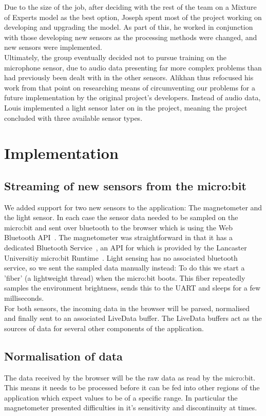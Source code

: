 \documentclass{article}
\begin{document}
Due to the size of the job, after deciding with the rest of the team on a Mixture of Experts model as the best option, Joseph spent most of the project working on developing and upgrading the model. As part of this, he worked in conjunction with those developing new sensors as the processing methods were changed, and new sensors were implemented. \\

Ultimately, the group eventually decided not to pursue training on the microphone sensor, due to audio data presenting far more complex problems than had previously been dealt with in the other sensors. Alikhan thus refocused his work from that point on researching means of circumventing our problems for a future implementation by the original project's developers. Instead of audio data, Louis implemented a light sensor later on in the project, meaning the project concluded with three available sensor types.

\section{Implementation}%
\label{sec:implementation}

\subsection{Streaming of new sensors from the micro:bit}%
\label{subsec:streaming}
We added support for two new sensors to the application: The magnetometer and the light sensor. In each case the sensor data needed to be sampled on the micro:bit and sent over bluetooth to the browser which is using the Web Bluetooth API~\cite{bluetoothapi}. The magnetometer was straightforward in that it has a dedicated Bluetooth Service~\cite{microbitservices}, an API for which is provided by the Lancaster Universitiy micro:bit Runtime~\cite{magnetometerservice}. Light sensing has no associated bluetooth service, so we sent the sampled data manually instead: To do this we start a 'fiber' (a lightweight thread) when the micro:bit boots. This fiber repeatedly samples the environment brightness, sends this to the UART and sleeps for a few milliseconds. \\

For both sensors, the incoming data in the browser will be parsed, normalised and finally sent to an associated LiveData buffer. The LiveData buffers act as the sources of data for several other components of the application.

\subsection{Normalisation of data}%
\label{subsec:datanorm}
The data received by the browser will be the raw data as read by the micro:bit. This means it needs to be processed before it can be fed into other regions of the application which expect values to be of a specific range. In particular the magnetometer presented difficulties in it's sensitivity and discontinuity at times. \\
\end{document}
